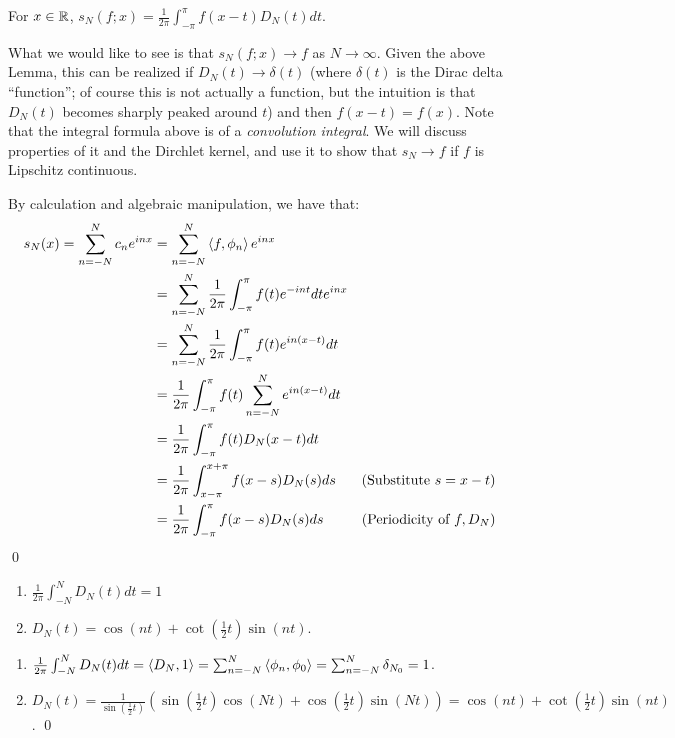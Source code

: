 \begin{nlemma}{ 2}{}
    For $x \in \mathbb{R}$, $s_N(f;x) = \frac{1}{2\pi}\int_{-\pi}^\pi f(x - t)D_N(t)dt$.
\end{nlemma}
\noindent What we would like to see is that $s_N(f;x) \rightarrow f$ as $N \rightarrow \infty$. Given the above Lemma, this can be realized if $D_N(t) \rightarrow \delta(t)$ (where $\delta(t)$ is the Dirac delta ``function''; of course this is not actually a function, but the intuition is that $D_N(t)$ becomes sharply peaked around $t$) and then $f(x - t) = f(x)$. Note that the integral formula above is of a \emph{convolution integral}. We will discuss properties of it and the Dirchlet kernel, and use it to show that $s_N \rightarrow f$ if $f$ is Lipschitz continuous.

\begin{nproof}
    By calculation and algebraic manipulation, we have that:
    \begin{align*}
        s_N(x) = \sum_{n=-N}^N c_ne^{inx} &= \sum_{n=-N}^{N}\left< f, \phi_n \right>e^{inx}
        \\ &= \sum_{n=-N}^N \frac{1}{2\pi}\int_{-\pi}^\pi f(t)e^{-int}dt e^{inx}
        \\ &= \sum_{n=-N}^N \frac{1}{2\pi}\int_{-\pi}^\pi f(t)e^{in(x - t)} dt
        \\ &= \frac{1}{2\pi}\int_{-\pi}^\pi f(t)\sum_{n=-N}^N e^{in(x-t)} dt 
        \\ &= \frac{1}{2\pi} \int_{-\pi}^\pi f(t)D_N(x - t)dt 
        \\ &= \frac{1}{2\pi}\int_{x - \pi}^{x + \pi}f(x - s)D_N(s)ds & \text{(Substitute $s = x - t$)}
        \\ &= \frac{1}{2\pi}\int_{- \pi}^{\pi}f(x - s)D_N(s)ds & \text{(Periodicity of $f, D_N$)}
    \end{align*} \qed
\end{nproof}

\begin{nlemma}{ 3}{}
    \begin{enumerate}
        \item $\frac{1}{2\pi}\int_{-N}^N D_N(t)dt = 1$
        \item $D_N(t) = \cos(nt) + \cot(\frac{1}{2}t)\sin(nt)$. 
    \end{enumerate}
\end{nlemma}
\begin{nproof}
    \begin{enumerate}
        \item $\frac{1}{2\pi}\int_{-N}^N D_N(t)dt = \left< D_N, 1 \right> = \sum_{n=-N}^N \left< \phi_n, \phi_0 \right> = \sum_{n=-N}^N \delta_{N_0} = 1$.
        \item $D_N(t) = \frac{1}{\sin(\frac{1}{2}t)}\left(\sin(\frac{1}{2}t)\cos(Nt) + \cos(\frac{1}{2}t)\sin(Nt)\right) = \cos(nt) + \cot(\frac{1}{2}t)\sin(nt)$. \qed
    \end{enumerate}
\end{nproof}

